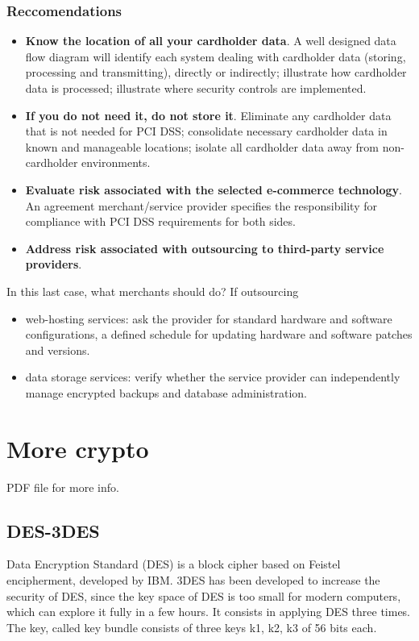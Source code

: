 \documentclass[a4paper, 10pt, titlepage]{article}
\begin{document}
\subsubsection*{Reccomendations}
\begin{itemize}
\item \textbf{Know the location of all your cardholder data}. A well designed data flow diagram will identify each system dealing with cardholder data (storing, processing and transmitting), directly or indirectly; illustrate how cardholder data is processed; illustrate where security controls are implemented.
\item \textbf{If you do not need it, do not store it}. Eliminate any cardholder data that is not needed for PCI DSS; consolidate necessary cardholder data in known and manageable locations; isolate all cardholder data away from non-cardholder environments.
\item \textbf{Evaluate risk associated with the selected e-commerce technology}. An agreement merchant/service provider specifies the responsibility for compliance with PCI DSS requirements for both sides.
\item \textbf{Address risk associated with outsourcing to third-party service providers}.
\end{itemize}
In this last case, what merchants should do? If outsourcing
\begin{itemize}
\item web-hosting services: ask the provider for standard hardware and software configurations, a defined schedule for updating hardware and software patches and versions.
\item data storage services: verify whether the service provider can independently manage encrypted backups and database administration.
\end{itemize}

\newpage
\section{More crypto}
PDF file for more info.
\subsection{DES-3DES}
Data Encryption Standard (DES) is a block cipher based on Feistel encipherment, developed by IBM. 3DES has been developed to increase the security of DES, since the key space of DES is too small for modern computers, which can explore it fully in a few hours.
It consists in applying DES three times. The key, called key bundle consists of three keys k1, k2, k3 of 56 bits each.
\end{document}
